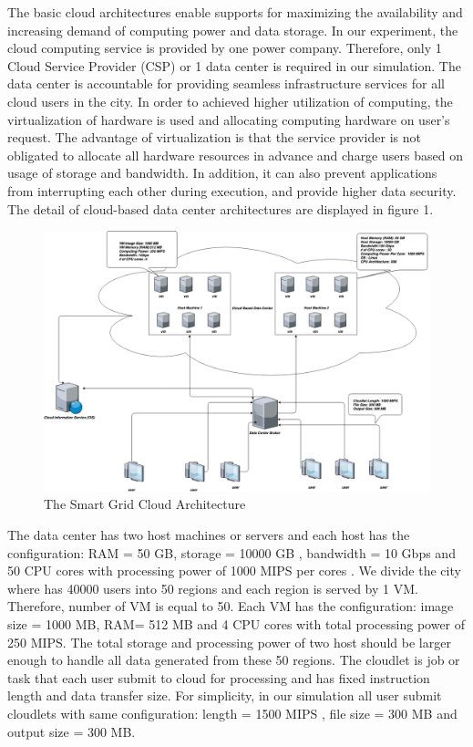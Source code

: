 \documentclass[12pt]{article}
\begin{document}
The basic cloud architectures enable supports for maximizing the availability and increasing demand of computing power and data storage\cite{ok2}. In our experiment, the cloud computing service is provided by one power company. Therefore, only 1 Cloud Service Provider (CSP) or 1 data center is required in our simulation. The data center is accountable for providing seamless infrastructure services for all cloud users in the city. In order to achieved higher utilization of computing, the virtualization of hardware is used and allocating computing hardware on user's request. The advantage of virtualization is that the service provider is not obligated to allocate all  hardware resources in advance and charge users based on usage of storage and bandwidth. In addition, it can also prevent applications from interrupting each other during execution, and provide higher data security. The detail of cloud-based data center architectures are displayed in figure 1.

\begin{figure}[ht!]
\centering
\includegraphics[scale=0.2]{smart_grid_cloud.png}
\caption{The Smart Grid Cloud Architecture}
\end{figure}

\indent The data center has two host machines or servers and each host has the configuration: RAM = 50 GB,  storage  = 10000 GB , bandwidth = 10 Gbps and  50 CPU cores with processing power of 1000 MIPS per cores .  We divide the city where has 40000 users into 50 regions and each region is served by 1 VM.  Therefore, number of VM is equal to 50.  Each VM has the configuration: image size = 1000 MB, RAM= 512 MB and 4 CPU cores with total processing power of 250 MIPS. The total storage and processing power of two host should be larger enough to handle all data  generated from these 50 regions.  The cloudlet is job or task that each user submit to cloud for processing and has fixed instruction length and data transfer size. For simplicity, in our simulation all user submit cloudlets with same configuration: length = 1500 MIPS , file size = 300 MB and output size = 300 MB. 


\newpage


\end{document}
